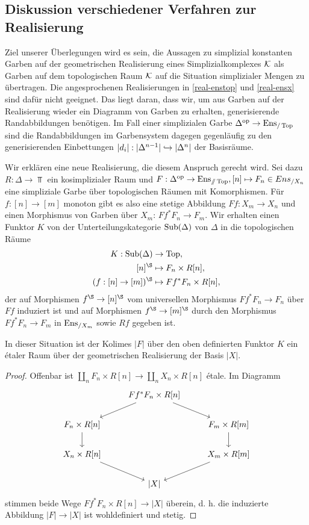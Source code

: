 \subsection{Diskussion verschiedener Verfahren zur Realisierung}

Ziel unserer Überlegungen wird es sein, die Aussagen zu simplizial
konstanten Garben auf der geometrischen Realisierung eines
Simplizialkomplexes $\mathcal{K}$ als Garben auf dem topologischen Raum $\mathcal{K}$
auf die Situation simplizialer Mengen zu übertragen. Die
angesprochenen Realisierungen in \ref{real-enstop} und \ref{real-ensx}
sind dafür nicht geeignet. Das liegt daran, dass wir, um aus Garben
auf der Realisierung wieder ein Diagramm von Garben zu erhalten,
generisierende Randabbildungen benötigen. Im Fall einer simplizialen
Garbe $\Delta^\mathrm{op} \to \operatorname{Ens}_{/\operatorname{Top}}$ sind die Randabbildungen im
Garbensystem dagegen gegenläufig zu den generisierenden Einbettungen
$|d_i|: |\Delta^{n-1}| \hookrightarrow |\Delta^n|$ der Basisräume.

Wir erklären eine neue Realisierung, die diesem Anspruch gerecht wird.
Sei dazu $R: \Delta \to \Top$ ein kosimplizialer Raum und
$F: \Delta^\mathrm{op} \to \operatorname{Ens}_{\mathbin{/\mkern-6mu/}\operatorname{Top}}, [n] \mapsto F_n \in Ens_{/X_n}$
eine simpliziale Garbe über topologischen Räumen mit Komorphismen. Für
$f: [n] \to [m]$ monoton gibt es also eine stetige Abbildung $Ff:
X_m \to X_n$ und einen Morphismus von Garben über $X_m$: $Ff^* F_n \to
F_m$. Wir erhalten einen Funktor $K$ von der Unterteilungskategorie
$\operatorname{Sub}(\Delta)$ von $\Delta$ in die topologischen Räume
\begin{align*}
  K: \Sub(\Delta) &\to \Top, \\
  [n]^\S &\mapsto F_n \times R[n], \\
  (f: [n] \to [m])^\S &\mapsto Ff^* F_n \times R[n],
\end{align*}
der auf Morphismen $f^\S \to [n]^\S$ vom universellen Morphismus $Ff^*
F_n \to F_n$ über $Ff$ induziert ist und auf Morphismen $f^\S \to
[m]^\S$ durch den Morphismus $Ff^* F_n \to F_m$ in $\operatorname{Ens}_{/X_m}$ sowie
$Rf$ gegeben ist.
\begin{prop}
  In dieser Situation ist der Kolimes $|F|$ über den oben definierten
  Funktor $K$ ein étaler Raum über der geometrischen Realisierung der
  Basis $|X|$.
\end{prop}
\begin{proof}
  Offenbar ist $\coprod_n F_n \times R[n] \to \coprod_n X_n \times
  R[n]$ étale. Im Diagramm
  \[ \begin{tikzcd}
    & \arrow{ld} Ff^* F_n \times R[n] \arrow{rd} & \\
    F_n \times R[n] \arrow{d} & & F_m \times R[m] \arrow{d} \\
    X_n \times R[n] \arrow{rd} & & X_m \times R[m] \arrow{ld} \\
    & \lvert X \rvert &
  \end{tikzcd} \]
  stimmen beide Wege $Ff^* F_n \times R[n] \to |X|$ überein, d. h. die
  induzierte Abbildung $|F| \to |X|$ ist wohldefiniert und stetig.

  
\end{proof}

